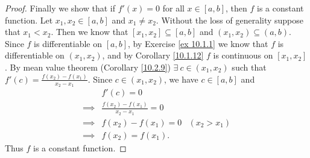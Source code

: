 \begin{proof}
    Finally we show that if \(f'(x) = 0\) for all \(x \in [a, b]\), then \(f\) is a constant function.
    Let \(x_1, x_2 \in [a, b]\) and \(x_1 \neq x_2\).
    Without the loss of generality suppose that \(x_1 < x_2\).
    Then we know that \([x_1, x_2] \subseteq [a, b]\) and \((x_1, x_2) \subseteq (a, b)\).
    Since \(f\) is differentiable on \([a, b]\), by Exercise \ref{ex 10.1.1} we know that \(f\) is differentiable on \((x_1, x_2)\), and by Corollary \ref{10.1.12} \(f\) is continuous on \([x_1, x_2]\).
    By mean value theorem (Corollary \ref{10.2.9}) \(\exists\ c \in (x_1, x_2)\) such that \(f'(c) = \frac{f(x_2) - f(x_1)}{x_2 - x_1}\).
    Since \(c \in (x_1, x_2)\), we have \(c \in [a, b]\) and
    \begin{align*}
                 & f'(c) = 0                                           \\
        \implies & \frac{f(x_2) - f(x_1)}{x_2 - x_1} = 0               \\
        \implies & f(x_2) - f(x_1) = 0                   & (x_2 > x_1) \\
        \implies & f(x_2) = f(x_1).
    \end{align*}
    Thus \(f\) is a constant function.
\end{proof}
